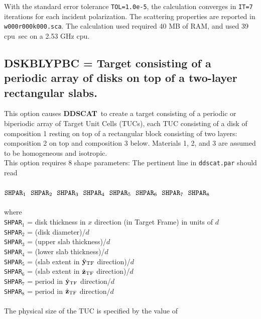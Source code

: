 With the standard error tolerance {\tt TOL=1.0e-5}, 
the calculation converges in {\tt IT=7} iterations for each incident
polarization.
The scattering properties are reported in {\tt w000r000k000.sca}.
The calculation used required 40 MB of RAM, and used 39 cpu~sec 
on a 2.53 GHz cpu.
\subsection{ DSKBLYPBC = Target consisting of a periodic array of disks on top 
            of a two-layer rectangular slabs.}
            \label{sec:DSKBLYPBC}
            This option causes {{\bf DDSCAT}}\ to create a target consisting
	    of a periodic or biperiodic array of Target Unit Cells (TUCs),  
            each TUC consisting of a disk of composition 1
	    resting on top of a rectangular block consisting of
	    two layers: composition 2 on top and composition 3 below.
	    Materials 1, 2, and 3 are assumed to be homogeneous and isotropic.
	    \ \\
	    This option requires 8 shape parameters:\newline
	    The pertinent line in {\tt ddscat.par} should read\\
	    \ \\
	${\tt SHPAR}_1~~{\tt SHPAR}_2~~{\tt SHPAR}_3~~{\tt SHPAR}_4~~{\tt SHPAR}_5~~{\tt SHPAR}_6~~{\tt SHPAR}_7~~{\tt SHPAR}_8$\\
	    \ \\
	where\\
	{\tt SHPAR}$_1$ = disk thickness in $x$ direction 
	(in Target Frame) in units of $d$\\
	{\tt SHPAR}$_2$ = (disk diameter)/$d$\\
	{\tt SHPAR}$_3$ = (upper slab thickness)/$d$\\
	{\tt SHPAR}$_4$ = (lower slab thickness)/$d$\\
	{\tt SHPAR}$_5$ = (slab extent in $\hat{\bf y}_{\rm TF}$ direction)/$d$\\
	{\tt SHPAR}$_6$ = (slab extent in $\hat{\bf z}_{\rm TF}$ direction)/$d$\\
	{\tt SHPAR}$_7$ = period in $\hat{\bf y}_{\rm TF}$ direction/$d$\\
	{\tt SHPAR}$_8$ = period in $\hat{\bf z}_{\rm TF}$ direction/$d$\\
	\ \\
	The physical size of the TUC is specified by the value of
